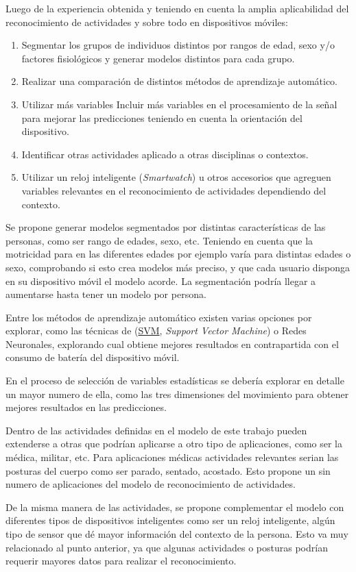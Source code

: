 Luego de la experiencia obtenida y teniendo en cuenta la amplia aplicabilidad
del reconocimiento de actividades y sobre todo en dispositivos móviles:
\begin{enumerate}
\item Segmentar los grupos de individuos distintos por rangos de edad, sexo
y/o factores fisiológicos y generar modelos distintos para cada grupo. 
\item Realizar una comparación de distintos métodos de aprendizaje automático. 
\item Utilizar más variables Incluir más variables en el procesamiento de
la señal para mejorar las predicciones teniendo en cuenta la orientación
del dispositivo. 
\item Identificar otras actividades aplicado a otras disciplinas o contextos. 
\item Utilizar un reloj inteligente (\emph{Smartwatch}) u otros accesorios
que agreguen variables relevantes en el reconocimiento de actividades
dependiendo del contexto. 
\end{enumerate}
Se propone generar modelos segmentados por distintas características
de las personas, como ser rango de edades, sexo, etc. Teniendo en
cuenta que la motricidad para en las diferentes edades por ejemplo
varía para distintas edades o sexo, comprobando si esto crea modelos
más preciso, y que cada usuario disponga en su dispositivo móvil el
modelo acorde. La segmentación podría llegar a aumentarse hasta tener
un modelo por persona.

Entre los métodos de aprendizaje automático existen varias opciones
por explorar, como las técnicas de (\hyperlink{abbr}{SVM}, \emph{Support
Vector Machine}) o Redes Neuronales, explorando cual obtiene mejores
resultados en contrapartida con el consumo de batería del dispositivo
móvil.

En el proceso de selección de variables estadísticas se debería explorar
en detalle un mayor numero de ella, como las tres dimensiones del
movimiento para obtener mejores resultados en las predicciones. 

Dentro de las actividades definidas en el modelo de este trabajo pueden
extenderse a otras que podrían aplicarse a otro tipo de aplicaciones,
como ser la médica, militar, etc. Para aplicaciones médicas actividades
relevantes serian las posturas del cuerpo como ser parado, sentado,
acostado. Esto propone un sin numero de aplicaciones del modelo de
reconocimiento de actividades. 

De la misma manera de las actividades, se propone complementar el
modelo con diferentes tipos de dispositivos inteligentes como ser
un reloj inteligente, algún tipo de sensor que dé mayor información
del contexto de la persona. Esto va muy relacionado al punto anterior,
ya que algunas actividades o posturas podrían requerir mayores datos
para realizar el reconocimiento.
